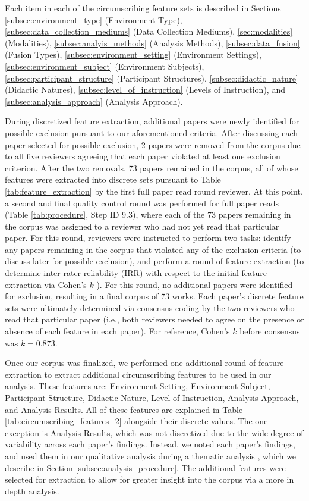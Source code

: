 \documentclass[manuscript,screen,review]{acmart}
\begin{document}
Each item in each of the circumscribing feature sets is described in Sections \ref{subsec:environment_type} (Environment Type), \ref{subsec:data_collection_mediums} (Data Collection Mediums), \ref{sec:modalities} (Modalities), \ref{subsec:analyis_methods} (Analysis Methods), \ref{subsec:data_fusion} (Fusion Types), \ref{subsec:environment_setting} (Environment Settings), \ref{subsec:environment_subject} (Environment Subjects), \ref{subsec:participant_structure} (Participant Structures), \ref{subsec:didactic_nature} (Didactic Natures), \ref{subsec:level_of_instruction} (Levels of Instruction), and \ref{subsec:analysis_approach} (Analysis Approach).

During discretized feature extraction, additional papers were newly identified for possible exclusion pursuant to our aforementioned criteria. After discussing each paper selected for possible exclusion, 2 papers were removed from the corpus due to all five reviewers agreeing that each paper violated at least one exclusion criterion. After the two removals, 73 papers remained in the corpus, all of whose features were extracted into discrete sets pursuant to Table \ref{tab:feature_extraction} by the first full paper read round reviewer. At this point, a second and final quality control round was performed for full paper reads (Table \ref{tab:procedure}, Step ID 9.3), where each of the 73 papers remaining in the corpus was assigned to a reviewer who had not yet read that particular paper. For this round, reviewers were instructed to perform two tasks: identify any papers remaining in the corpus that violated any of the exclusion criteria (to discuss later for possible exclusion), and perform a round of feature extraction (to determine inter-rater reliability (IRR) with respect to the initial feature extraction via Cohen's $k$ \cite{cohen1960coefficient}). For this round, no additional papers were identified for exclusion, resulting in a final corpus of 73 works. Each paper's discrete feature sets were ultimately determined via consensus coding \cite{} by the two reviewers who read that particular paper (i.e., both reviewers needed to agree on the presence or absence of each feature in each paper). For reference, Cohen's $k$ before consensus was $k=0.873$.  

Once our corpus was finalized, we performed one additional round of feature extraction to extract additional circumscribing features to be used in our analysis. These features are: Environment Setting, Environment Subject, Participant Structure, Didactic Nature, Level of Instruction, Analysis Approach, and Analysis Results. All of these features are explained in Table \ref{tab:circumscribing_features_2} alongside their discrete values. The one exception is Analysis Results, which was not discretized due to the wide degree of variability across each paper's findings. Instead, we noted each paper's findings, and used them in our qualitative analysis during a thematic analysis \cite{braun2012thematic}, which we describe in Section \ref{subsec:analysis_procedure}. The additional features were selected for extraction to allow for greater insight into the corpus via a more in depth analysis.
\end{document}
